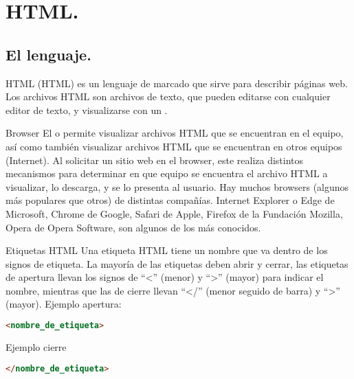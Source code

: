 \section{HTML.}
\subsection{El lenguaje.}


\begin{frame}{HTML}
   (HTML) es un lenguaje de marcado que sirve
  para describir páginas web.
  \jump
  Los archivos HTML son archivos de texto, que pueden editarse con cualquier
  editor de texto, y visualizarse con un .
\end{frame}


\begin{frame}{Browser}
  El  o  permite visualizar archivos HTML
  que se encuentran en el equipo, así como también visualizar archivos HTML
  que se encuentran en otros equipos (Internet).
  \jump
  Al solicitar un sitio web en el browser, este realiza distintos mecanismos
  para determinar en que equipo se encuentra el archivo HTML a visualizar, lo
  descarga, y se lo presenta al usuario.
  \jump
  Hay muchos browsers (algunos más populares que otros) de distintas compañías.
  Internet Explorer o Edge de Microsoft, Chrome de Google, Safari de Apple,
  Firefox de la Fundación Mozilla, Opera de Opera Software, son algunos de los
  más conocidos.
\end{frame}


\begin{frame}[fragile]{Etiquetas HTML}
	Una etiqueta HTML tiene un nombre que va dentro de los signos de etiqueta.
	\jump
	La mayoría de las etiquetas deben abrir y cerrar, las etiquetas de apertura
  llevan los signos de ``<'' (menor) y ``>'' (mayor) para indicar el nombre,
  mientras que las de cierre llevan ``</'' (menor seguido de barra) y ``>'' (mayor).
	\jump
	Ejemplo apertura:
	\begin{lstlisting}[language=HTML]
<nombre_de_etiqueta>
	\end{lstlisting}

	Ejemplo cierre
	\begin{lstlisting}[language=HTML]
</nombre_de_etiqueta>
	\end{lstlisting}
\end{frame}

